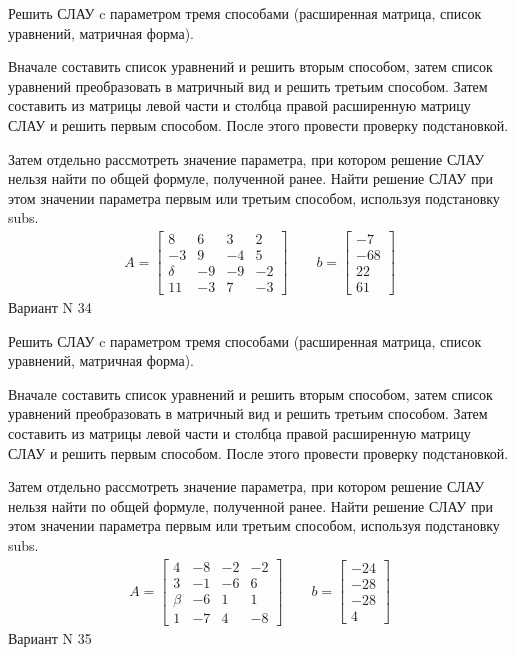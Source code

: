 \documentclass[11pt]{report}
\begin{document}
Решить СЛАУ c параметром тремя способами (расширенная матрица, список уравнений, матричная форма).

Вначале составить список уравнений и решить вторым способом,
затем список уравнений преобразовать в матричный вид и решить третьим способом.
Затем составить из матрицы левой части и столбца правой расширенную матрицу СЛАУ и решить первым способом.
После этого провести проверку подстановкой.

Затем отдельно рассмотреть значение параметра, при котором решение СЛАУ нельзя найти по общей формуле,
полученной ранее.
Найти решение СЛАУ при этом значении параметра первым или третьим способом, используя подстановку subs.
\begin{align*}
    A = \left[\begin{matrix}8 & 6 & 3 & 2\\-3 & 9 & -4 & 5\\\delta & -9 & -9 & -2\\11 & -3 & 7 & -3\end{matrix}\right]
\qquad b = \left[\begin{matrix}-7\\-68\\22\\61\end{matrix}\right]
\end{align*}
\newpage
Вариант N 34


Решить СЛАУ c параметром тремя способами (расширенная матрица, список уравнений, матричная форма).

Вначале составить список уравнений и решить вторым способом,
затем список уравнений преобразовать в матричный вид и решить третьим способом.
Затем составить из матрицы левой части и столбца правой расширенную матрицу СЛАУ и решить первым способом.
После этого провести проверку подстановкой.

Затем отдельно рассмотреть значение параметра, при котором решение СЛАУ нельзя найти по общей формуле,
полученной ранее.
Найти решение СЛАУ при этом значении параметра первым или третьим способом, используя подстановку subs.
\begin{align*}
    A = \left[\begin{matrix}4 & -8 & -2 & -2\\3 & -1 & -6 & 6\\\beta & -6 & 1 & 1\\1 & -7 & 4 & -8\end{matrix}\right]
\qquad b = \left[\begin{matrix}-24\\-28\\-28\\4\end{matrix}\right]
\end{align*}
\newpage
Вариант N 35
\end{document}
